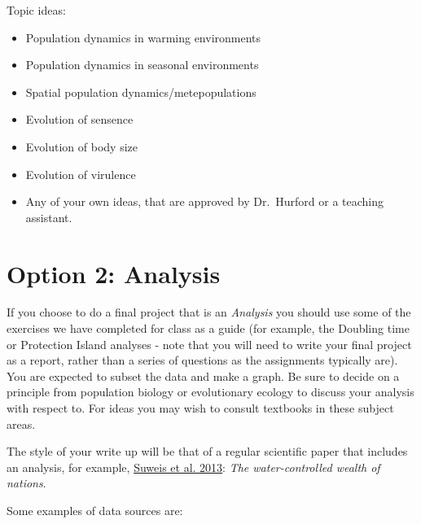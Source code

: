 \documentclass[]{book}
\begin{document}
Topic ideas:

\begin{itemize}
\item
  Population dynamics in warming environments
\item
  Population dynamics in seasonal environments
\item
  Spatial population dynamics/metepopulations
\item
  Evolution of sensence
\item
  Evolution of body size
\item
  Evolution of virulence
\item
  Any of your own ideas, that are approved by Dr.~Hurford or a teaching
  assistant.
\end{itemize}

\section{Option 2: Analysis}\label{option-2-analysis}

If you choose to do a final project that is an \emph{Analysis} you
should use some of the exercises we have completed for class as a guide
(for example, the Doubling time or Protection Island analyses - note
that you will need to write your final project as a report, rather than
a series of questions as the assignments typically are). You are
expected to subset the data and make a graph. Be sure to decide on a
principle from population biology or evolutionary ecology to discuss
your analysis with respect to. For ideas you may wish to consult
textbooks in these subject areas.

The style of your write up will be that of a regular scientific paper
that includes an analysis, for example,
\href{https://www.pnas.org/content/110/11/4230}{Suweis et al. 2013}:
\emph{The water-controlled wealth of nations}.

Some examples of data sources are:
\end{document}
